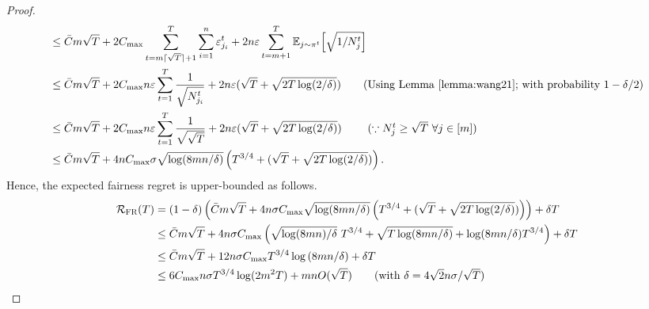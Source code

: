 \begin{proof}
\begin{align*}
& \leq \bar{C}m \sqrt{T} + 2C_{\max}  \sum_{t=m\lceil \sqrt{T } \rceil + 1}^T \sum_{i=1}^n \varepsilon_{j_i}^t +  2 n \varepsilon \sum_{t=m +1}^T \mathbb{E}_{j \sim \pi^t} \Big [\sqrt{1/N_{j}^{t}} \Big ]\\
& \leq   \bar{C}m \sqrt{T }  + 2 C_{\max} n \varepsilon  \sum_{t= 1 }^T \frac{1}{\sqrt{N_{j_i}^{t}}} +  2n\varepsilon  ( \sqrt{T} + \sqrt{2T\log(2/\delta)}) \tag{Using Lemma  \ref{lemma:wang21}; with probability $1-\delta/2$}\\
& \leq   \bar{C}m \sqrt{T }  + 2 C_{\max} n \varepsilon  \sum_{t=  1}^T \frac{1}{\sqrt{ \sqrt{T} }} +   2n\varepsilon ( \sqrt{T} + \sqrt{2T\log(2/\delta)}) \ \tag{$\because N_j^t\geq \sqrt{T}\ \forall j\in [m]$} \\
& \leq   \bar{C}m \sqrt{T }  + 4nC_{\max}\sigma \sqrt{\log(8mn/\delta)} \left(   T^{3/4} +   ( \sqrt{T} + \sqrt{2T\log(2/\delta)})\right).
\end{align*}
Hence, the expected fairness regret is upper-bounded as follows.
\begin{align*}
\mathcal{R}_{\textsc{FR}}(T) & = (1-\delta)\left( \bar{C}m \sqrt{T }  + 4n\sigma C_{\max} \sqrt{\log(8mn/\delta)} \left(  T^{3/4} +   ( \sqrt{T} + \sqrt{2T\log(2/\delta)})\right) \right) + \delta T    \\
&\leq \bar{C}m\sqrt{T}+4n\sigma C_{\max}\left( \sqrt{\log(8mn)/\delta}\ T^{3/4} +  \sqrt{T\log(8mn/\delta)} +  \log(8mn/\delta)T^{3/4}\right) +\delta T\\
&\leq \bar{C}m\sqrt{T} + 12n\sigma C_{\max} T^{3/4}\log{(8mn/\delta)} + \delta T\\
&\leq 6 C_{\max}n\sigma T^{3/4}\log(2m^2T)+mnO(\sqrt{T}) \tag{with $\delta = 4\sqrt{2}n\sigma/\sqrt{T}$}
\end{align*}

\end{proof}